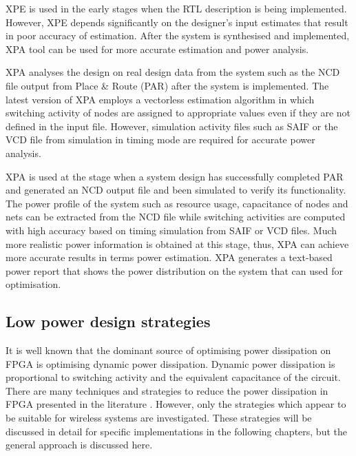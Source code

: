XPE is used in the early stages when the RTL description is being implemented. 
However, XPE depends significantly on the designer's input estimates that result in poor accuracy of estimation.
After the system is synthesised and implemented, XPA tool can be used for more accurate estimation and power analysis.

XPA analyses the design on real design data from the system such as the NCD file output from Place \& Route (PAR) after the system is implemented. 
The latest version of XPA employs a vectorless estimation algorithm in which switching activity of nodes are assigned to appropriate values even if they are not defined in the input file.
However, simulation activity files such as SAIF or the VCD file from simulation in timing mode are required for accurate power analysis. 

XPA is used at the stage when a system design has successfully completed PAR and generated an NCD output file and been simulated to verify its functionality. 
The power profile of the system such as resource usage, capacitance of nodes and nets can be extracted from the NCD file while switching activities are computed with high accuracy based on timing simulation from SAIF or VCD files. Much more realistic power information is obtained at this stage, thus, XPA can achieve more accurate results in terms power estimation.
XPA generates a text-based power report that shows the power distribution on the system that can used for optimisation.

\subsection{Low power design strategies}

It is well known that the dominant source of optimising power dissipation on FPGA is optimising dynamic power dissipation. 
Dynamic power dissipation is proportional to switching activity and the equivalent capacitance of the circuit. 
There are many techniques and strategies to reduce the power dissipation in FPGA presented in the literature \cite{Danckaert1999,Kovacs2000,Czapski2007,Liu2009,Ahuja2010}.
However, only the strategies which appear to be suitable for wireless systems are investigated.
These strategies will be discussed in detail for specific implementations in the following chapters, but the general approach is discussed here.

